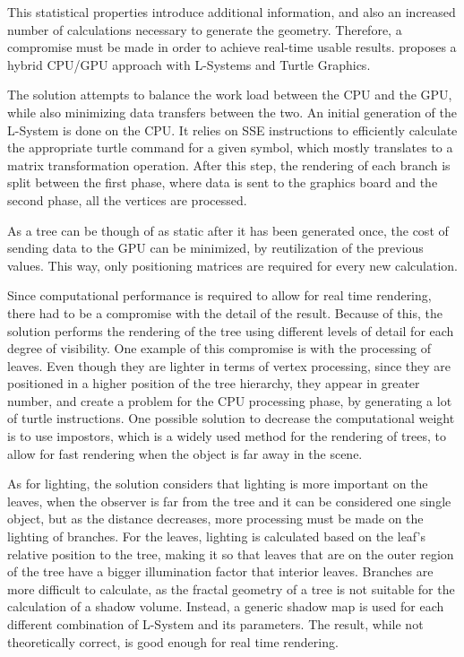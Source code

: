 \documentclass{acmtog}
\begin{document}
This statistical properties introduce additional information, and also an increased number of calculations necessary to generate the geometry. Therefore, a compromise must be made in order to achieve real-time usable results. \cite{baele2005real} proposes a hybrid CPU/GPU approach with L-Systems and Turtle Graphics.

The solution attempts to balance the work load between the CPU and the GPU, while also minimizing data transfers between the two. An initial generation of the L-System is done on the CPU. It relies on SSE instructions to efficiently calculate the appropriate turtle command for a given symbol, which mostly translates to a matrix transformation operation. After this step, the rendering of each branch is split between the first phase, where data is sent to the graphics board and the second phase, all the vertices are processed.

As a tree can be though of as static after it has been generated once, the cost of sending data to the GPU can be minimized, by reutilization of the previous values. This way, only positioning matrices are required for every new calculation.

Since computational performance is required to allow for real time rendering, there had to be a compromise with the detail of the result. Because of this, the solution performs the rendering of the tree using different levels of detail for each degree of visibility. One example of this compromise is with the processing of leaves. Even though they are lighter in terms of vertex processing, since they are positioned in a higher position of the tree hierarchy, they appear in greater number, and create a problem for the CPU processing phase, by generating a lot of turtle instructions.
One possible solution to decrease the computational weight is to use impostors, which is a widely used method for the rendering of trees, to allow for fast rendering when the object is far away in the scene.

As for lighting, the solution considers that lighting is more important on the leaves, when the observer is far from the tree and it can be considered one single object, but as the distance decreases, more processing must be made on the lighting of branches. For the leaves, lighting is calculated based on the leaf's relative position to the tree, making it so that leaves that are on the outer region of the tree have a bigger illumination factor that interior leaves. Branches are more difficult to calculate, as the fractal geometry of a tree is not suitable for the calculation of a shadow volume. Instead, a generic shadow map is used for each different combination of L-System and its parameters. The result, while not theoretically correct, is good enough for real time rendering.
\end{document}
